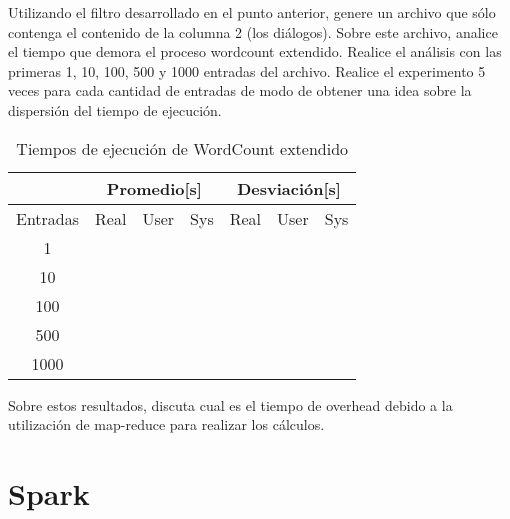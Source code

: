 \documentclass[12pt,letterpaper,twoside]{article}
\begin{document}
{\color{red} Utilizando el filtro desarrollado en el punto anterior, genere un archivo que sólo contenga el contenido de la columna 2 (los diálogos). Sobre este archivo, analice el tiempo que demora el proceso wordcount extendido. Realice el análisis con las primeras 1, 10, 100, 500 y 1000 entradas del archivo. Realice el experimento 5 veces para cada cantidad de entradas de modo de obtener una idea sobre la dispersión del tiempo de ejecución.

    \begin{table}
        \centering
        \begin{tabular}{|c||c|c|c||c|c|c|}
            \multicolumn{1}{c}{} & \multicolumn{3}{c}{Promedio[s]} & \multicolumn{3}{c}{Desviación[s]}                           \\
            \hline
            Entradas             & Real                            & User                              & Sys & Real & User & Sys \\
            \hline
            \hline
            1                    &                                 &                                   &     &      &      &     \\
            \hline
            10                   &                                 &                                   &     &      &      &     \\
            \hline
            100                  &                                 &                                   &     &      &      &     \\
            \hline
            500                  &                                 &                                   &     &      &      &     \\
            \hline
            1000                 &                                 &                                   &     &      &      &     \\
            \hline
        \end{tabular}
        \caption{Tiempos de ejecución de WordCount extendido}
        \label{table:001}
    \end{table}

    Sobre estos resultados, discuta cual es el tiempo de overhead debido a la utilización de map-reduce para realizar los cálculos.
}

\section{Spark}
\end{document}
